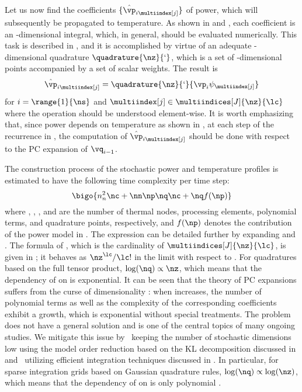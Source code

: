 Let us now find the coefficients $\{ \hat{\vp}_{i \multiindex[j]} \}$ of power,
which will subsequently be propagated to temperature. As shown in
 and , each coefficient is an
\nz-dimensional integral, which, in general, should be evaluated numerically.
This task is described in , and it is accomplished
by virtue of an adequate \nz-dimensional quadrature $\quadrature{\nz}{\lq}$,
which is a set of \nz-dimensional points accompanied by a set of scalar weights.
The result is
\[
  \hat{\vp}_{i \multiindex[j]} = \quadrature{\nz}{\lq}{\vp_i \psi_{\multiindex[j]}}
\]
for $i = \range{1}{\ns}$ and $\multiindex[j] \in \multiindices[J]{\nz}{\lc}$
where the operation should be understood element-wise. It is worth emphasizing
that, since power depends on temperature as shown in , at each
step of the recurrence in , the computation of
$\hat{\vp}_{i \multiindex[j]}$ should be done with respect to the \ac{PC}
expansion of $\vq_{i - 1}$.

The construction process of the stochastic power and temperature profiles is
estimated to have the following time complexity per time step:
\[
  \bigo{n_n^2 \nc + \nn \np \nq \nc + \nq f(\np)}
\]
where \nn, \np, \nc, and \nq are the number of thermal nodes, processing
elements, polynomial terms, and quadrature points, respectively, and $f(\np)$
denotes the contribution of the power model in . The
expression can be detailed further by expanding \nc and \nq. The formula of \nc,
which is the cardinality of $\multiindices[J]{\nz}{\lc}$, is given in
; it behaves as $\nz^\lc / \lc!$ in the
limit with respect to \nz. For quadratures based on the full tensor product,
$\log(\nq) \propto \nz$, which means that the dependency of \nq on \nz is
exponential. It can be seen that the theory of \ac{PC} expansions suffers from
the curse of dimensionality \cite{eldred2008, xiu2010}: when \nz increases, the
number of polynomial terms as well as the complexity of the corresponding
coefficients exhibit a growth, which is exponential without special treatments.
The problem does not have a general solution and is one of the central topics of
many ongoing studies. We mitigate this issue by \one~keeping the number of
stochastic dimensions low using the model order reduction based on the \ac{KL}
decomposition discussed in  and \two~utilizing
efficient integration techniques discussed in . In
particular, for sparse integration grids based on Gaussian quadrature rules,
$\log(\nq) \propto \log(\nz)$, which means that the dependency of \nq on \nz is
only polynomial \cite{heiss2008}.

